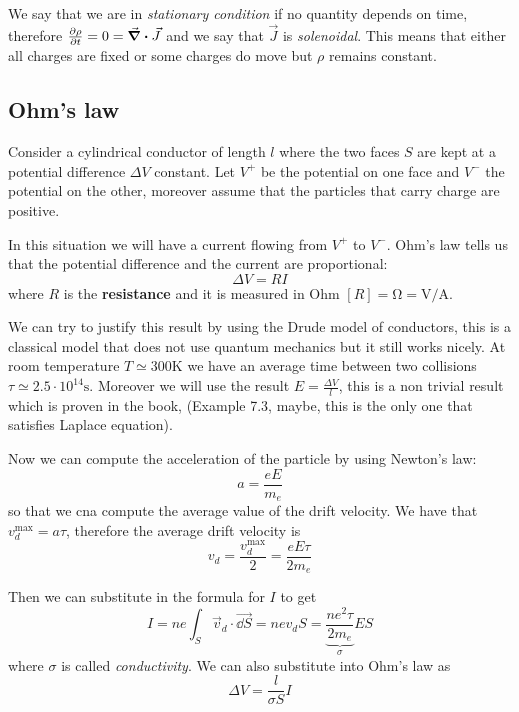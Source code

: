 \documentclass[12pt]{extarticle}
\begin{document}
We say that we are in \emph{stationary condition} if no quantity depends on time,
therefore $\pdv{\rho}{t} = 0 = \div \vec J$ and we say that $\vec J$ is \emph{solenoidal}.
This means that either all charges are fixed or some charges do move but $\rho$ remains constant.

\subsection{Ohm's law}

Consider a cylindrical conductor of length $l$
where the two faces $S$ are kept at a potential difference $\Delta V$ constant.
Let $V^+$ be the potential on one face and $V^-$ the potential on the other,
moreover assume that the particles that carry charge are positive.

In this situation we will have a current flowing from $V^+$ to $V^-$.
Ohm's law tells us that the potential difference and the current are proportional:
\begin{equation}
	\Delta V = R I
\end{equation}
where $R$ is the \textbf{resistance} and it is measured in Ohm $[R] = \si{\ohm} = \si{\volt \per \ampere}$.

We can try to justify this result by using the Drude model of conductors,
this is a classical model that does not use quantum mechanics but it still works nicely.
At room temperature $T \simeq 300 \si{\kelvin}$
we have an average time between two collisions $\tau \simeq 2.5 \cdot 10^14 \si{\second}$.
Moreover we will use the result $E = \frac{\Delta V}{l}$, this is a non trivial result which is proven in the book,
(Example 7.3, maybe, this is the only one that satisfies Laplace equation).

Now we can compute the acceleration of the particle by using Newton's law:
\begin{equation}
	a = \frac{e E}{m_e}
\end{equation}
so that we cna compute the average value of the drift velocity.
We have that $v_d^{\text{max}} = a \tau$, therefore the average drift velocity is
\begin{equation}
	v_d = \frac{v_d^{\text{max}}}{2} = \frac{e E \tau}{2 m_e}
\end{equation}

Then we can substitute in the formula for $I$ to get
\begin{equation}
	I = n e \int_S \vec v_d \cdot \vec{\dd S} = n e v_d S = \underbrace{\frac{n e^2 \tau}{2 m_e}}_\sigma E S
\end{equation}
where $\sigma$ is called \emph{conductivity}.
We can also substitute into Ohm's law as
\begin{equation}
	\Delta V = \frac{l}{\sigma S} I
\end{equation}
\end{document}
